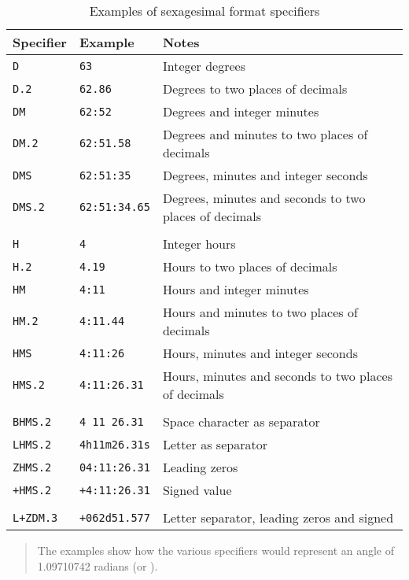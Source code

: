 \begin{table}[htbp]

\begin{center}
\begin{tabular}{lll}
Specifier     & Example            & Notes          \\ \hline
{\tt D}       & {\tt 63}          & Integer degrees \\
{\tt D.2}     & {\tt 62.86}       & Degrees to two places of decimals \\
{\tt DM}      & {\tt 62:52}       & Degrees and integer minutes \\
{\tt DM.2}    & {\tt 62:51.58}    & Degrees and minutes to two places of decimals \\
{\tt DMS}     & {\tt 62:51:35}    & Degrees, minutes and integer seconds \\
{\tt DMS.2}   & {\tt 62:51:34.65} & Degrees, minutes and seconds to two places of decimals \\
              &                    & \\
{\tt H}       & {\tt 4}            & Integer hours \\
{\tt H.2}     & {\tt 4.19}         & Hours to two places of decimals \\ 
{\tt HM}      & {\tt 4:11}         & Hours and integer minutes \\
{\tt HM.2}    & {\tt 4:11.44}      & Hours and minutes to two places of decimals \\
{\tt HMS}     & {\tt 4:11:26}      & Hours, minutes and integer seconds \\
{\tt HMS.2}   & {\tt 4:11:26.31}   & Hours, minutes and seconds to two places of decimals \\
              &                    & \\
{\tt BHMS.2}  & {\tt 4 11 26.31}   & Space character as separator \\
{\tt LHMS.2}  & {\tt 4h11m26.31s}  & Letter as separator \\
{\tt ZHMS.2}  & {\tt 04:11:26.31}  & Leading zeros \\
{\tt +HMS.2}  & {\tt +4:11:26.31}  & Signed value \\
              &                    & \\
{\tt L+ZDM.3} & {\tt +062d51.577}  & Letter separator, leading zeros and signed \\
\end{tabular}

\begin{quote}
The examples show how the various specifiers would represent an angle of
1.09710742 radians (or ).
\end{quote}

\caption{\label{SEXAG_EXAM}Examples of sexagesimal format specifiers}
\end{center}

\end{table}

